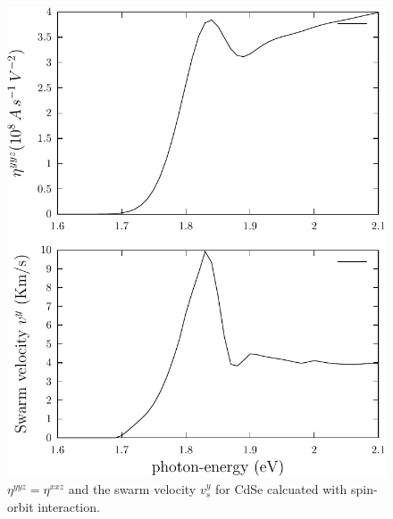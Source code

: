 \documentclass[12pt]{article}
\numberwithin{equation}{section}
\begin{document}
\begin{figure}[t]
\begin{center}
\includegraphics[scale=.7]{plots/eta-vs}
\end{center}
\caption{$\eta^{yyz}=\eta^{xxz}$ and the swarm velocity $v^y_s$ for CdSe 
  calcuated with spin-orbit interaction. 
}
\label{fig:eta-vs}
\end{figure}
\end{document}
